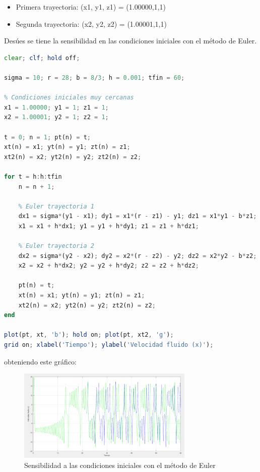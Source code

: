 \documentclass[a4paper,12pt]{article}
\theoremstyle{mytheor}
\begin{document}
\begin{itemize}
    \item Primera trayectoria: (x1, y1, z1) = (1.00000,1,1)
    \item Segunda trayectoria: (x2, y2, z2) = (1.00001,1,1)
\end{itemize}

Desúes se tiene la sensibilidad en las condiciones iniciales con el método de Euler.
\begin{lstlisting}[language=Octave, breaklines=true]
clear; clf; hold off;

sigma = 10; r = 28; b = 8/3; h = 0.001; tfin = 60;

% Condiciones iniciales muy cercanas
x1 = 1.00000; y1 = 1; z1 = 1;
x2 = 1.00001; y2 = 1; z2 = 1;

t = 0; n = 1; pt(n) = t;
xt(n) = x1; yt(n) = y1; zt(n) = z1;
xt2(n) = x2; yt2(n) = y2; zt2(n) = z2;

for t = h:h:tfin
    n = n + 1;
    
    % Euler trayectoria 1
    dx1 = sigma*(y1 - x1); dy1 = x1*(r - z1) - y1; dz1 = x1*y1 - b*z1;
    x1 = x1 + h*dx1; y1 = y1 + h*dy1; z1 = z1 + h*dz1;

    % Euler trayectoria 2
    dx2 = sigma*(y2 - x2); dy2 = x2*(r - z2) - y2; dz2 = x2*y2 - b*z2;
    x2 = x2 + h*dx2; y2 = y2 + h*dy2; z2 = z2 + h*dz2;

    pt(n) = t;
    xt(n) = x1; yt(n) = y1; zt(n) = z1;
    xt2(n) = x2; yt2(n) = y2; zt2(n) = z2;
end

plot(pt, xt, 'b'); hold on; plot(pt, xt2, 'g');
grid on; xlabel('Tiempo'); ylabel('Velocidad fluido (x)');
\end{lstlisting}

obteniendo este gráfico:

\begin{figure}[H]
    \centering
    \includegraphics[width=0.75\textwidth]{g6.png}
    \caption{Sensibilidad a las condiciones iniciales con el método de Euler}
    \label{fig:sensibilidad_euler}
\end{figure}
\end{document}
